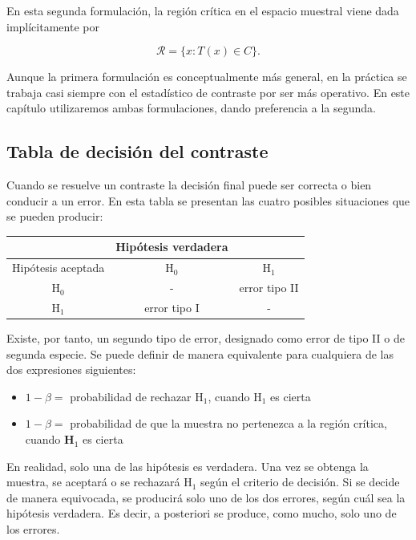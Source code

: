 \documentclass[
]{article}
\providecommand{\tightlist}{%
  \setlength{\itemsep}{0pt}\setlength{\parskip}{0pt}}
\begin{document}
En esta segunda formulación, la región crítica en el espacio muestral viene dada implícitamente por

\[
\mathcal{R}=\{x:T(x)\in C\}.
\]

Aunque la primera formulación es conceptualmente más general, en la práctica se trabaja casi siempre con el estadístico de contraste por ser más operativo. En este capítulo utilizaremos ambas formulaciones, dando preferencia a la segunda.

\subsection{Tabla de decisión del contraste}\label{tabla-de-decisiuxf3n-del-contraste}

Cuando se resuelve un contraste la decisión final puede ser correcta o bien conducir a un error. En esta tabla se presentan las cuatro posibles situaciones que se pueden producir:

\begin{longtable}[]{@{}ccc@{}}
\toprule\noalign{}
& Hipótesis verdadera & \\
\midrule\noalign{}
\endhead
\bottomrule\noalign{}
\endlastfoot
Hipótesis aceptada & \(\mathrm{H}_{0}\) & \(\mathrm{H}_{1}\) \\
\(\mathrm{H}_{0}\) & - & error tipo II \\
\(\mathrm{H}_{1}\) & error tipo I & - \\
\end{longtable}

Existe, por tanto, un segundo tipo de error, designado como error de tipo II o de segunda especie. Se puede definir de manera equivalente para cualquiera de las dos expresiones siguientes:

\begin{itemize}
\tightlist
\item
  \(1-\beta=\) probabilidad de rechazar \(\mathrm{H}_{1}\), cuando \(\mathrm{H}_{1}\) es cierta\\
\item
  \(1-\beta=\) probabilidad de que la muestra no pertenezca a la región crítica, cuando \(\mathbf{H}_{1}\) es cierta
\end{itemize}

En realidad, solo una de las hipótesis es verdadera. Una vez se obtenga la muestra, se aceptará o se rechazará \(\mathrm{H}_{1}\) según el criterio de decisión. Si se decide de manera equivocada, se producirá solo uno de los dos errores, según cuál sea la hipótesis verdadera. Es decir, a posteriori se produce, como mucho, solo uno de los errores.
\end{document}
